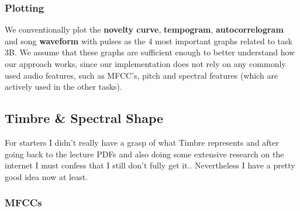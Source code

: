 \documentclass[
  letterpaper,
  twocolumn]{article}
\begin{document}
\subsubsection{Plotting}\label{plotting}

We conventionally plot the \textbf{novelty curve}, \textbf{tempogram},
\textbf{autocorrelogram} and song \textbf{waveform} with pulses as the 4
most important graphs related to task 3B. We assume that these graphs
are sufficient enough to better understand how our approach works, since
our implementation does not rely on any commonly used audio features,
such as MFCC's, pitch and spectral features (which are actively used in
the other tasks).

\subsection{Timbre \& Spectral Shape}\label{timbre-spectral-shape}

For starters I didn't really have a grasp of what Timbre represents and
after going back to the lecture PDFs and also doing some extensive
research on the internet I must confess that I still don't fully get
it.. Nevertheless I have a pretty good idea now at least.

\subsubsection{MFCCs}\label{mfccs}
\end{document}
